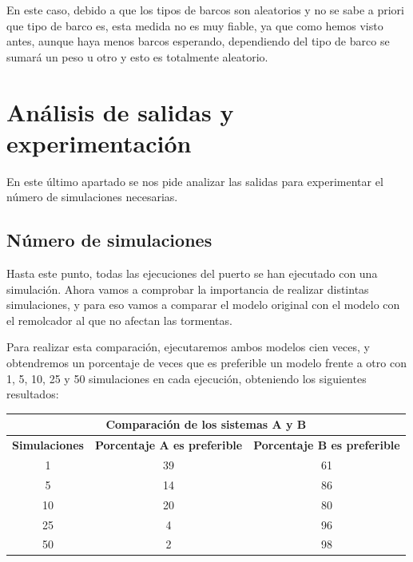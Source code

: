 \documentclass[12pt, spanish]{article}
\begin{document}
En este caso, debido a que los tipos de barcos son aleatorios y no se sabe a priori que tipo de barco es, esta medida no es muy fiable, ya que como hemos visto antes, aunque haya menos barcos esperando, dependiendo del tipo de barco se sumará un peso u otro y esto es totalmente aleatorio.


\newpage

\section{Análisis de salidas y experimentación}

En este último apartado se nos pide analizar las salidas para experimentar el número de simulaciones necesarias.

\subsection{Número de simulaciones}

Hasta este punto, todas las ejecuciones del puerto se han ejecutado con una simulación. Ahora vamos a comprobar la importancia de realizar distintas simulaciones, y para eso vamos a comparar el modelo original con el modelo con el remolcador al que no afectan las tormentas.

Para realizar esta comparación, ejecutaremos ambos modelos cien veces, y obtendremos un porcentaje de veces que es preferible un modelo frente a otro con 1, 5, 10, 25 y 50 simulaciones en cada ejecución, obteniendo los siguientes resultados:

\begin{table}[H]
\centering
\begin{tabular}{|c|c|c|}
\hline
\multicolumn{3}{|c|}{\textbf{Comparación de los sistemas A y B}}                                  \\ \hline
\textbf{Simulaciones} & \textbf{Porcentaje A es preferible} & \textbf{Porcentaje B es preferible} \\ \hline
1                     & 39                                  & 61                                  \\ \hline
5                     & 14                                  & 86                                  \\ \hline
10                    & 20                                  & 80                                  \\ \hline
25                    & 4                                   & 96                                  \\ \hline
50                    & 2                                   & 98                                  \\ \hline
\end{tabular}
\end{table}
\end{document}
